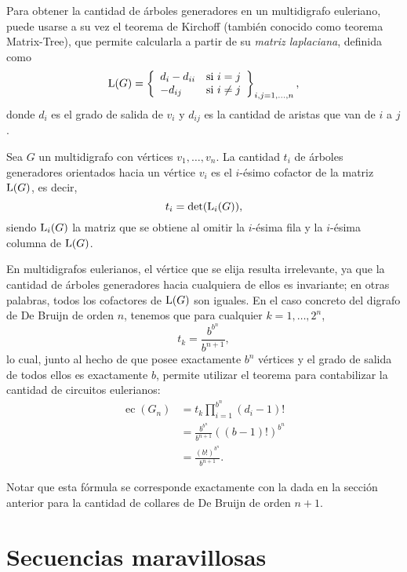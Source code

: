 Para obtener la cantidad de árboles generadores en un multidigrafo euleriano,
puede usarse a su vez el teorema de Kirchoff (también conocido como teorema
Matrix-Tree), que permite calcularla
a partir de su \emph{matriz laplaciana}, definida como
\[ \operatorname{L}(G) = \left\lbrace \begin{array}{ll}
	d_i - d_{ii} & \text{si $i = j$} \\
	-d_{ij}       & \text{si $i \neq j$}
\end{array} \right\rbrace_{i,j = 1,\dots,n}, \]
donde $d_i$ es el grado de salida de $v_i$ y $d_{ij}$ es la cantidad de
aristas que van de $i$ a $j$.

\begin{theorem*}
	Sea $G$ un multidigrafo con vértices $v_1, \dots, v_n$. La cantidad $t_i$
	de árboles generadores orientados hacia un vértice $v_i$ es el $i$-ésimo
	cofactor de la matriz $\operatorname{L}(G)$, es decir,
	\[ t_i = \operatorname{det}(\operatorname{L}_i(G)), \]
	siendo $\operatorname{L}_i(G)$ la matriz que se obtiene al omitir la $i$-ésima fila
	y la $i$-ésima columna de $\operatorname{L}(G)$.
\end{theorem*}

En multidigrafos eulerianos, el vértice que se elija resulta irrelevante, ya
que la cantidad de árboles generadores hacia cualquiera de ellos es invariante;
en otras palabras, todos los cofactores de $\operatorname{L}(G)$ son iguales. En
el caso concreto del digrafo de De Bruijn de orden $n$, tenemos que
\cite{van-aardenne-ehrenfest-circuits-and-trees} para cualquier
$k = 1, \dots, 2^n$,
\[ t_k = \frac{b^{b^{n}}}{b^{n+1}}, \]
lo cual, junto al hecho de que posee exactamente $b^n$ vértices y el grado de
salida de todos ellos es exactamente $b$, permite utilizar el teorema \BEST{} para
contabilizar la cantidad de circuitos eulerianos:
\begin{align*}
	\operatorname{ec}(G_n) &= t_k \prod_{i=1}^{b^n} (d_i - 1)! \\
		&= \frac{b^{b^{n}}}{b^{n+1}} \left((b - 1)!\right)^{b^n} \\
		&= \frac{(b!)^{b^{n}}}{b^{n+1}}.
\end{align*}

Notar que esta fórmula se corresponde exactamente con la dada en la sección
anterior para la cantidad de collares de De Bruijn de orden $n + 1$.

\section{Secuencias maravillosas}

